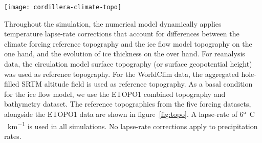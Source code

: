 \begin{figure*}[t]
	\vspace*{2mm}
	\begin{center}
		\texttt{[image: cordillera-climate-topo]}
	\end{center}
	\caption{Reference topography used for temperature lapse-rate corrections from the five climate datasets used in the study and ETOPO1 topography used as basal condition for the ice flow model.}
	\label{fig:topo}
\end{figure*}

Throughout the simulation, the numerical model dynamically applies temperature lapse-rate corrections that account for differences between the climate forcing reference topography and the ice flow model topography on the one hand, and the evolution of ice thickness on the over hand. For reanalysis data, the circulation model surface topography (or surface geopotential height) was used as reference topography. For the WorldClim data, the aggregated hole-filled SRTM altitude field is used as reference topography. As a basal condition for the ice flow model, we use the ETOPO1\citep{data:etopo1} combined topography and bathymetry dataset. The reference topographies from the five forcing datasets, alongside the ETOPO1 data are shown in figure~\ref{fig:topo}. A lapse-rate of 6\unit{\degree C\,km^{-1}} is used in all simulations. No lapse-rate corrections apply to precipitation rates.

